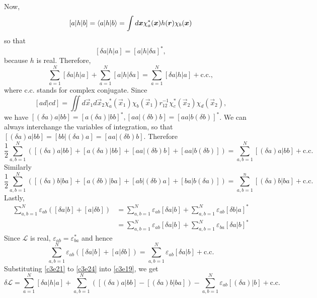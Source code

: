 Now,
\[
[a|h|b] = \braket{a|h|b} = \int d\bm{x}\chi_a^\ast(\bm{x})h(\bm{r})\chi_b(
\bm{x})
\]
so that
\begin{equation}\label{c3e20}
[\delta a|h|a] = [a|h|\delta a]^\ast,
\end{equation}
because $h$ is real. Therefore,
\begin{equation}\label{c3e21}
\sum_{a=1}^N[\delta a|h|a] + \sum_{a=1}^N[a|h|\delta a] =
\sum_{a=1}^N[\delta a|h|a] + \text{c.c.},
\end{equation}
where c.c. stands for complex conjugate.
Since
\[
[ad|cd] = \iint d\vec{x}_1d\vec{x}_2 \chi_a^\ast(\vec{x}_1)\chi_b(\vec{x}_1)
r_{12}^{-1}\chi_c^\ast(\vec{x}_2)\chi_d(\vec{x}_2),
\]
we have $[(\delta a)a|bb] = [a(\delta a)|bb]^\ast, [aa|(\delta b)b] = 
[aa|b(\delta b)]^\ast$. We can always interchange the variables of integration, 
so that $[(\delta a)a|bb] = [bb|(\delta a)a] = [aa|(\delta b)b]$. Therefore
\begin{equation}\label{c3e22}
\frac{1}{2}\sum_{a,b=1}^N\left([(\delta a)a|bb] + [a(\delta a)|bb] + 
 [aa|(\delta b)b] + [aa|b(\delta b)]\right) = \sum_{a,b=1}^N[(\delta a)a|bb] +
 \text{c.c.}
\end{equation}
Similarly
\begin{equation}\label{c3e23}
\frac{1}{2}\sum_{a,b=1}^N\left([(\delta a)b|ba] + [a(\delta b)|ba] + 
 [ab|(\delta b)a] + [ba|b(\delta a)]\right) =
\sum_{a,b=1}^n[(\delta a)b|ba] + \text{c.c.}
\end{equation}
Lastly,
\[
\begin{aligned}
\sum_{a,b=1}^N\varepsilon_{ab}([\delta a|b] + [a|\delta b]) &=
\sum_{a,b=1}^N\varepsilon_{ab}[\delta a|b] + \sum_{a,b=1}^N\varepsilon_{ab}
[\delta b|a]^\ast \\
 &= \sum_{a,b=1}^N\varepsilon_{ab}[\delta a|b] + \sum_{a,b=1}^N\varepsilon_{ba}
[\delta a|b]^\ast
\end{aligned}
\]
Since $\mathscr{L}$ is real, $\varepsilon_{ab} = \varepsilon_{ba}^\ast$ and 
hence
\begin{equation}\label{c3e24}
\sum_{a,b=1}^N\varepsilon_{ab}([\delta a|b] + [a|\delta b]) =
\sum_{a,b=1}^N\varepsilon_{ab}[\delta a|b] + \text{c.c.}
\end{equation}
Substituting \eqref{c3e21} to \eqref{c3e24} into \eqref{c3e19}, we get
\begin{equation}\label{c3e25}
\delta\mathscr{L} = \sum_{a=1}^N[\delta a|h|a] + \sum_{a,b=1}^N\left([(\delta a)
a|bb] - [(\delta a)b|ba]\right) - \sum_{a,b=1}^N\varepsilon_{ab}[(\delta a)|b]
+ \text{c.c.}
\end{equation}
